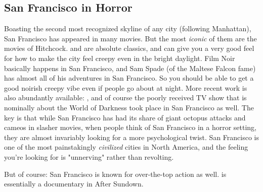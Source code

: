 \subsection{San Francisco in Horror}

\hspace{\parindent} Boasting the second most recognized skyline of any city (following Manhattan), San Francisco has appeared in many movies. But the most \textit{iconic} of them are the movies of Hitchcock.  and  are absolute classics, and can give you a very good feel for how to make the city feel creepy even in the bright daylight. Film Noir basically happens in San Francisco, and Sam Spade (of the Maltese Falcon fame) has almost all of his adventures in San Francisco. So you should be able to get a good noirish creepy vibe even if people go about at night. More recent work is also abundantly available: , and of course the poorly received  TV show that is nominally about the World of Darkness took place in San Francisco as well. The key is that while San Francisco has had its share of giant octopus attacks and cameos in slasher movies, when people think of San Francisco in a horror setting, they are almost invariably looking for a more psychological twist. San Francisco is one of the most painstakingly \textit{civilized} cities in North America, and the feeling you're looking for is "unnerving" rather than revolting.

But of course: San Francisco is known for over-the-top action as well.  is essentially a documentary in After Sundown.
